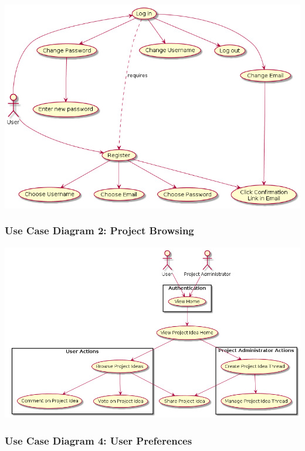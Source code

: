 \documentclass[twoside,letterpaper]{article}
\begin{document}
	\includegraphics[width=6.0in]{images/UseCaseDiagrams/Authentication.png}
	\newpage


	\subsubsection[Use Case Diagram 2: Project Browsing]{\rmfamily\bfseries\color{black}
	Use Case Diagram 2: Project Browsing}
	
	\includegraphics[width=6.0in]{images/UseCaseDiagrams/ProjectBrowsing}
	
	\newpage


	\subsubsection[Use Case Diagram 4: User Preferences]{\rmfamily\bfseries\color{black}
		Use Case Diagram 4: User Preferences}
	
	\bigskip
	
\end{document}
